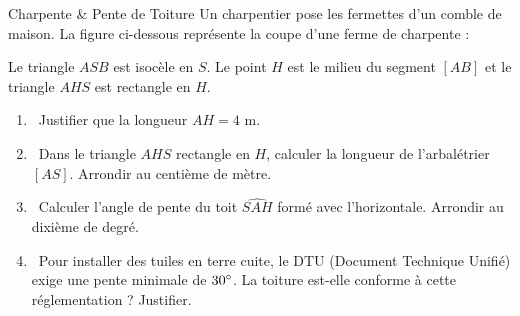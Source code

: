 \begin{sujetdnb}{Charpente \& Pente de Toiture}
Un charpentier pose les fermettes d'un comble de maison. La figure ci-dessous représente la coupe d'une ferme de charpente :

\begin{center}
\end{center}

Le triangle $ASB$ est isocèle en $S$. Le point $H$ est le milieu du segment $[AB]$ et le triangle $AHS$ est rectangle en $H$.

\begin{enumerate}
    \item \capSApproprier\ Justifier que la longueur $AH = 4\text{ m}$.
    \item \capRealiser\ Dans le triangle $AHS$ rectangle en $H$, calculer la longueur de l'arbalétrier $[AS]$. Arrondir au centième de mètre.
    \item \capRealiser\ Calculer l'angle de pente du toit $\widehat{SAH}$ formé avec l'horizontale. Arrondir au dixième de degré.
    \item \capValider\ Pour installer des tuiles en terre cuite, le DTU (Document Technique Unifié) exige une pente minimale de $30^{\circ}$. La toiture est-elle conforme à cette réglementation ? Justifier.
\end{enumerate}
\lignesreponse[7]
\end{sujetdnb}

